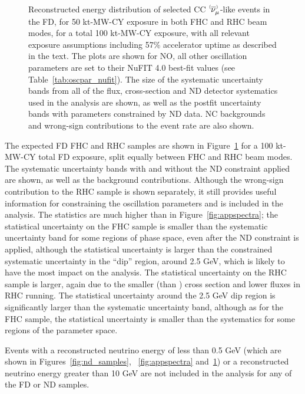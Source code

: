 \begin{figure}[htbp]
  \\
\caption{Reconstructed energy distribution of selected CC $\;\nu^{\bracketbar}_{\mu}$-like events in the FD, for 50 kt-MW-CY exposure in both FHC and RHC beam modes, for a total 100 kt-MW-CY exposure, with all relevant exposure assumptions including 57\% accelerator uptime as described in the text. The plots are shown for NO, all other oscillation parameters are set to their NuFIT 4.0 best-fit values (see Table~\ref{tab:oscpar_nufit}). The size of the systematic uncertainty bands from all of the flux, cross-section and ND detector systematics used in the analysis are shown, as well as the postfit uncertainty bands with parameters constrained by ND data. NC backgrounds and wrong-sign contributions to the event rate are also shown.}
\label{fig:disspectra}
\end{figure}
The expected FD FHC \numu and RHC \anumu samples are shown in Figure~\ref{fig:disspectra} for a 100 kt-MW-CY total FD exposure, split equally between FHC and RHC beam modes. The systematic uncertainty bands with and without the ND constraint applied are shown, as well as the background contributions. Although the wrong-sign \numu contribution to the RHC \anumu sample is shown separately, it still provides useful information for constraining the oscillation parameters and is included in the analysis. The statistics are much higher than in Figure~\ref{fig:appspectra}; the statistical uncertainty on the \numu FHC sample is smaller than the systematic uncertainty band for some regions of phase space, even after the ND constraint is applied, although the statistical uncertainty is larger than the constrained systematic uncertainty in the ``dip'' region, around 2.5 GeV, which is likely to have the most impact on the analysis. The statistical uncertainty on the \anumu RHC sample is larger, again due to the smaller \anumu (than \numu) cross section and lower fluxes in RHC running. The statistical uncertainty around the 2.5 GeV dip region is significantly larger than the systematic uncertainty band, although as for the FHC \numu sample, the statistical uncertainty is smaller than the systematics for some regions of the parameter space.

Events with a reconstructed neutrino energy of less than 0.5 GeV (which are shown in Figures~\ref{fig:nd_samples}, ~\ref{fig:appspectra} and~\ref{fig:disspectra}) or a reconstructed neutrino energy greater than 10 GeV are not included in the analysis for any of the FD or ND samples.




